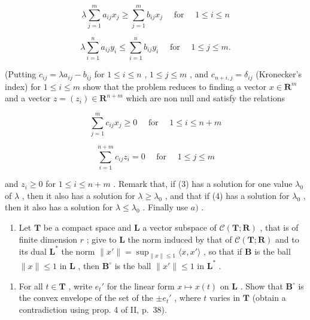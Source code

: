 \[
\lambda \sum_ {j = 1} ^ {m} a _ {i j} x _ {j} \geqslant \sum_ {j = 1} ^ {m} b _ {i j} x _ {j} \quad \text { for } \quad 1 \leqslant i \leqslant n\tag{1}
\]

\[
\lambda \sum_ {i = 1} ^ {n} a _ {i j} y _ {i} \leqslant \sum_ {i = 1} ^ {n} b _ {i j} y _ {i} \quad \text { for } \quad 1 \leqslant j \leqslant m\tag{2}.
\]

(Putting \(c_{ij} = \lambda a_{ij} - b_{ij}\) for \(1 \leqslant i \leqslant n\) , \(1 \leqslant j \leqslant m\) , and \(c_{n + i,j} = \delta_{ij}\) (Kronecker's index) for \(1 \leqslant i \leqslant m\) show that the problem reduces to finding a vector \(x \in \mathbf{R}^m\) and a vector \(z = (z_i) \in \mathbf{R}^{n + m}\) which are non null and satisfy the relations

\[
\sum_ {j = 1} ^ {m} c _ {i j} x _ {j} \geqslant 0 \quad \text { for } \quad 1 \leqslant i \leqslant n + m\tag{3}
\]

\[
\sum_ {i = 1} ^ {n + m} c _ {i j} z _ {i} = 0 \quad \text { for } \quad 1 \leqslant j \leqslant m\tag{4}
\]

and \(z_{i} \geqslant 0\) for \(1 \leqslant i \leqslant n + m\) . Remark that, if (3) has a solution for one value \(\lambda_0\) of \(\lambda\) , then it also has a solution for \(\lambda \geqslant \lambda_0\) , and that if (4) has a solution for \(\lambda_0\) , then it also has a solution for \(\lambda \leqslant \lambda_0\) . Finally use \(a)\) .

\begin{enumerate}
\def\labelenumi{\arabic{enumi})}
\setcounter{enumi}{7}
\tightlist
\item
  Let \(\mathbf{T}\) be a compact space and \(\mathbf{L}\) a vector subspace of \(\mathcal{C}(\mathbf{T};\mathbf{R})\) , that is of finite dimension \(r\) ; give to \(\mathbf{L}\) the norm induced by that of \(\mathcal{C}(\mathbf{T};\mathbf{R})\) and to its dual \(\mathbf{L}^*\) the norm \(\| x'\| = \sup_{\| x\| \leqslant 1} \langle x, x' \rangle\) , so that if \(\mathbf{B}\) is the ball \(\| x\| \leqslant 1\) in \(\mathbf{L}\) , then \(\mathbf{B}^\circ\) is the ball \(\| x'\| \leqslant 1\) in \(\mathbf{L}^*\) .
\end{enumerate}

\begin{enumerate}
\def\labelenumi{\alph{enumi})}
\tightlist
\item
  For all \(t \in \mathbf{T}\) , write \(e_t'\) for the linear form \(x \mapsto x(t)\) on \(\mathbf{L}\) . Show that \(\mathbf{B}^\circ\) is the convex envelope of the set of the \(\pm e_t'\) , where \(t\) varies in \(\mathbf{T}\) (obtain a contradiction using prop. 4 of II, p.~38).
\end{enumerate}

